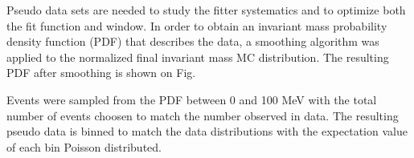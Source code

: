 Pseudo data sets are needed to study the fitter systematics and to optimize both
the fit function and window.  In order to obtain an invariant mass probability
density function (PDF) that describes the data, a smoothing algorithm was
applied to the normalized final invariant mass MC distribution.  The resulting
PDF after smoothing is shown on Fig.

Events were sampled from the PDF between 0 and 100 MeV with the total number of
events choosen to match the number observed in data.  The resulting pseudo data
is binned to match the data distributions with the expectation value of each 
bin Poisson distributed. 
